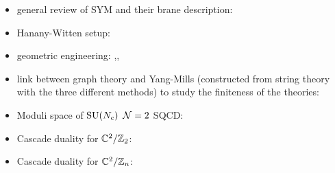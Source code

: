 \documentclass[a4paper,10pt]{article}
\begin{document}
\begin{itemize}
    \item general review of SYM and their brane description: \cite{Elitzur_1997}
    \item Hanany-Witten setup: \cite{1997}
    \item geometric engineering: \cite{https://doi.org/10.48550/arxiv.hep-th/9706110},\cite{Katz:1996xe},\cite{Katz:1996fh}
    \item link between graph theory and Yang-Mills (constructed from string theory with the three different methods) to study the finiteness of the theories: \cite{Hanany:1999sp}
    \item Moduli space of $\text{SU}(N_c)$ $\mathcal{N}=2$ SQCD: \cite{Argyres_1996}
    \item Cascade duality for $\mathbb{C}^2/\mathbb{Z}_2$: \cite{Benini_2009}
    \item Cascade duality for $\mathbb{C}^2/\mathbb{Z}_n$: \cite{Argurio_2013}
\end{itemize}

%

%

%

%

%

\pagebreak

\listoftodos

\pagebreak

\printbibliography
\end{document}
